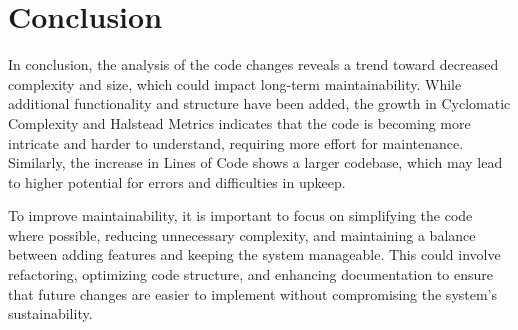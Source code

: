 \section{Conclusion}

In conclusion, the analysis of the code changes reveals a trend toward decreased complexity and size, which could impact
long-term maintainability. While additional functionality and structure have been added, the growth in Cyclomatic
Complexity and Halstead Metrics indicates that the code is becoming more intricate and harder to understand, requiring
more effort for maintenance. Similarly, the increase in Lines of Code shows a larger codebase, which may lead to higher
potential for errors and difficulties in upkeep.

To improve maintainability, it is important to focus on simplifying the code where possible, reducing unnecessary
complexity, and maintaining a balance between adding features and keeping the system manageable. This could involve
refactoring, optimizing code structure, and enhancing documentation to ensure that future changes are easier to
implement without compromising the system's sustainability.
